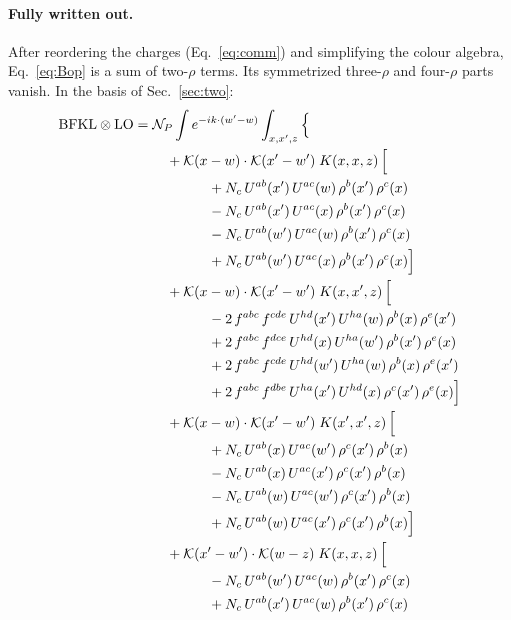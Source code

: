 \documentclass[10pt]{article}
\numberwithin{equation}{section}
\newcommand{\KK}{\mathcal K}
\newcommand{\NP}{\mathcal N_{P}}
\begin{document}
\paragraph{Fully written out.} After reordering the charges (Eq.~\eqref{eq:comm}) and simplifying the colour algebra, Eq.~\eqref{eq:Bop} is a sum of two-$\rho$ terms. Its symmetrized three-$\rho$ and four-$\rho$ parts vanish. In the basis of Sec.~\ref{sec:two}:
\begin{align}
\text{BFKL}\otimes\text{LO}={}&\NP\int e^{-ik\cdot(w'-w)}\int_{x,x',z}\Big\{\notag\\
&\quad +\KK(x-w)\cdot\KK(x'-w')\;K(x,x,z)\,\Big[\notag\\
&\qquad\qquad +N_c\,U^{ab}(x')\,U^{ac}(w)\,\rho^{b}(x')\,\rho^{c}(x)\notag\\
&\qquad\qquad - N_c\,U^{ab}(x')\,U^{ac}(x)\,\rho^{b}(x')\,\rho^{c}(x)\notag\\
&\qquad\qquad - N_c\,U^{ab}(w')\,U^{ac}(w)\,\rho^{b}(x')\,\rho^{c}(x)\notag\\
&\qquad\qquad +N_c\,U^{ab}(w')\,U^{ac}(x)\,\rho^{b}(x')\,\rho^{c}(x)\Big]\notag\\
&\quad +\KK(x-w)\cdot\KK(x'-w')\;K(x,x',z)\,\Big[\notag\\
&\qquad\qquad -2\,f^{abc}\,f^{cde}\,U^{hd}(x')\,U^{ha}(w)\,\rho^{b}(x)\,\rho^{e}(x')\notag\\
&\qquad\qquad +2\,f^{abc}\,f^{dce}\,U^{hd}(x)\,U^{ha}(w')\,\rho^{b}(x')\,\rho^{e}(x)\notag\\
&\qquad\qquad +2\,f^{abc}\,f^{cde}\,U^{hd}(w')\,U^{ha}(w)\,\rho^{b}(x)\,\rho^{e}(x')\notag\\
&\qquad\qquad +2\,f^{abc}\,f^{dbe}\,U^{ha}(x')\,U^{hd}(x)\,\rho^{c}(x')\,\rho^{e}(x)\Big]\notag\\
&\quad +\KK(x-w)\cdot\KK(x'-w')\;K(x',x',z)\,\Big[\notag\\
&\qquad\qquad +N_c\,U^{ab}(x)\,U^{ac}(w')\,\rho^{c}(x')\,\rho^{b}(x)\notag\\
&\qquad\qquad - N_c\,U^{ab}(x)\,U^{ac}(x')\,\rho^{c}(x')\,\rho^{b}(x)\notag\\
&\qquad\qquad - N_c\,U^{ab}(w)\,U^{ac}(w')\,\rho^{c}(x')\,\rho^{b}(x)\notag\\
&\qquad\qquad +N_c\,U^{ab}(w)\,U^{ac}(x')\,\rho^{c}(x')\,\rho^{b}(x)\Big]\notag\\
&\quad +\KK(x'-w')\cdot\KK(w-z)\;K(x,x,z)\,\Big[\notag\\
&\qquad\qquad - N_c\,U^{ab}(w')\,U^{ac}(w)\,\rho^{b}(x')\,\rho^{c}(x)\notag\\
&\qquad\qquad +N_c\,U^{ab}(x')\,U^{ac}(w)\,\rho^{b}(x')\,\rho^{c}(x)\notag\\

\end{align}
\end{document}
